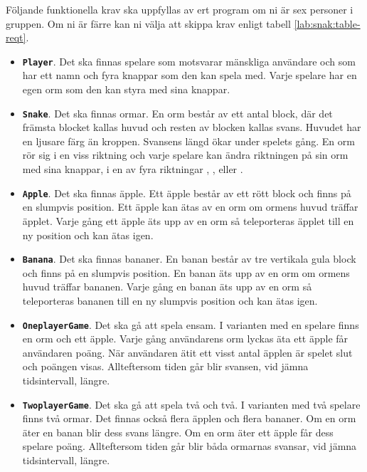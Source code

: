 Följande funktionella krav ska uppfyllas av ert program om ni är sex personer i gruppen. Om ni är färre kan ni välja att skippa krav enligt tabell \ref{lab:snak:table-reqt}.
\begin{itemize}[nosep, label={$\square$},]
\item \textbf{\texttt{Player}}. Det ska finnas spelare som motsvarar mänskliga användare och som har ett namn och fyra knappar som den kan spela med. Varje spelare har en egen orm som den kan styra med sina knappar.

\item \textbf{\texttt{Snake}}. Det ska finnas ormar. En orm består av ett antal block, där det främsta blocket kallas huvud och resten av blocken kallas svans. Huvudet har en ljusare färg än kroppen. Svansens längd ökar under spelets gång. En orm rör sig i en viss riktning och varje spelare kan ändra riktningen på sin orm med sina knappar, i en av fyra riktningar , ,  eller .

\item \textbf{\texttt{Apple}}. Det ska finnas äpple. Ett äpple består av ett rött block och finns på en slumpvis position. Ett äpple kan ätas av en orm om ormens huvud träffar äpplet. Varje gång ett äpple äts upp av en orm så teleporteras äpplet till en ny position och kan ätas igen.

\item \textbf{\texttt{Banana}}. Det ska finnas bananer. En banan består av tre vertikala gula block och finns på en slumpvis position. En banan äts upp av en orm om ormens huvud träffar bananen. Varje gång en banan äts upp av en orm så teleporteras bananen till en ny slumpvis position och kan ätas igen.

\item \textbf{\texttt{OneplayerGame}}. Det ska gå att spela ensam. I varianten med en spelare finns en orm och ett äpple. Varje gång användarens orm lyckas äta ett äpple får användaren poäng. När användaren ätit ett visst antal äpplen är spelet slut och poängen visas. Allteftersom tiden går blir svansen, vid jämna tidsintervall, längre.

\item \textbf{\texttt{TwoplayerGame}}. Det ska gå att spela två och två. I varianten med två spelare finns två ormar. Det finnas också flera äpplen och flera bananer. Om en orm äter en banan blir dess svans längre. Om en orm äter ett äpple får dess spelare poäng. Allteftersom tiden går blir båda ormarnas svansar, vid jämna tidsintervall, längre.

\end{itemize}
